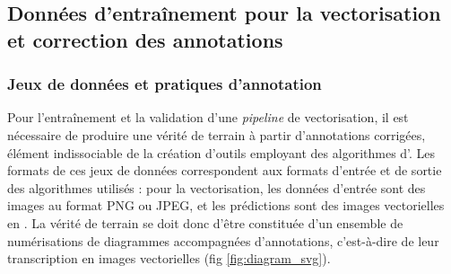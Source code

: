 \subsection{Données d’entraînement pour la vectorisation et correction des annotations}
    \subsubsection{Jeux de données et pratiques d'annotation}
    Pour l'entraînement et la validation d'une \textit{pipeline} de vectorisation, il est nécessaire de produire une vérité de terrain à partir d'annotations corrigées, élément indissociable de la création d'outils employant des algorithmes d'\ia. Les formats de ces jeux de données correspondent aux formats d'entrée et de sortie des algorithmes utilisés : pour la vectorisation, les données d'entrée sont des images au format PNG ou JPEG, et les prédictions sont des images vectorielles en \svg. La vérité de terrain se doit donc d'être constituée d'un ensemble de numérisations de diagrammes accompagnées d'annotations, c'est-à-dire de leur transcription en images vectorielles (fig \ref{fig:diagram_svg}).
    
